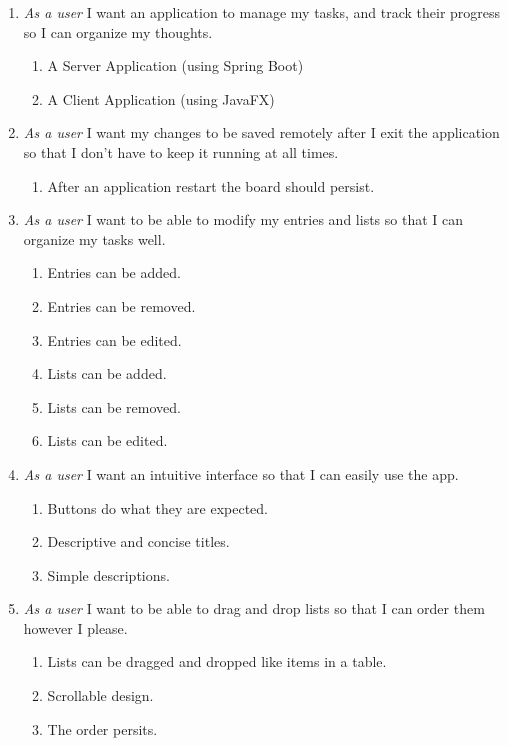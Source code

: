 \documentclass{article}
\begin{document}
	\begin{enumerate}
		\item \emph{As a user} I want an application to manage my tasks, and track their progress so I can organize my thoughts.
		\begin{enumerate}
			\item A Server Application (using Spring Boot)
			\item A Client Application (using JavaFX)
		\end{enumerate}

	\item \emph{As a user} I want my changes to be saved remotely after I exit the application so that I don't have to keep it running at all times.	
		\begin{enumerate}
			\item After an application restart the board should persist.
		\end{enumerate}
	\item \emph{As a user} I want to be able to modify my entries and lists so that I can organize my tasks well.
		\begin{enumerate}
			\item Entries can be added.
			\item Entries can be removed.
			\item Entries can be edited.
			\item Lists can be added.
			\item Lists can be removed.
			\item Lists can be edited.
		\end{enumerate}
	\item \emph{As a user} I want an intuitive interface so that I can easily use the app.
		\begin{enumerate}
			\item Buttons do what they are expected.
			\item Descriptive and concise titles.
			\item Simple descriptions.
		\end{enumerate}
	\item \emph{As a user} I want to be able to drag and drop lists so that I can order them however I please.
		\begin{enumerate}
			\item Lists can be dragged and dropped like items in a table. 
			\item Scrollable design.
			\item The order persits.
		\end{enumerate}

\end{enumerate}
\end{document}
